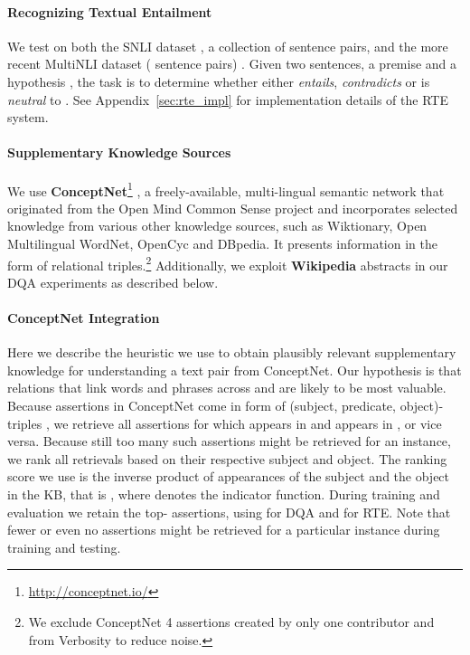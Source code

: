 \documentclass[11pt,a4paper]{article}
\begin{document}
\paragraph{Recognizing Textual Entailment} We test on both the SNLI dataset \citep{Bowman2015}, a collection of  sentence pairs, and the more recent MultiNLI dataset ( sentence pairs) \citep{williams2017broad}. Given two sentences, a premise  and a hypothesis , the task is to determine whether  either \textit{entails}, \textit{contradicts} or is \textit{neutral} to . See Appendix~\ref{sec:rte_impl} for implementation details of the RTE system.

\paragraph{Supplementary Knowledge Sources} We use \textbf{ConceptNet}\footnote{\url{http://conceptnet.io/}} \citep{Speer2012}, a freely-available, multi-lingual semantic network that originated from the Open Mind Common Sense project and incorporates selected knowledge from various other knowledge sources, such as Wiktionary, Open Multilingual WordNet, OpenCyc and DBpedia. It presents information in the form of relational triples.\footnote{We exclude ConceptNet 4 assertions created by only one contributor and from Verbosity to reduce noise.} Additionally, we exploit \textbf{Wikipedia} abstracts in our DQA experiments as described below.

\paragraph{ConceptNet Integration}
Here we describe the heuristic we use to obtain plausibly relevant supplementary knowledge for understanding a text pair  from ConceptNet. Our hypothesis is that relations that link words and phrases across  and  are likely to be most valuable. Because assertions  in ConceptNet come in form of (subject, predicate, object)-triples , we retrieve all assertions for which  appears in  and  appears in , or vice versa. Because still too many such assertions might be retrieved for an instance, we rank all retrievals based on their respective subject and object. The ranking score we use is the inverse product of appearances of the subject and the object in the KB, that is , where  denotes the indicator function.
During training and evaluation we retain the top- assertions, using  for DQA and  for RTE. Note that fewer or even no assertions might be retrieved for a particular instance during training and testing.
\end{document}
